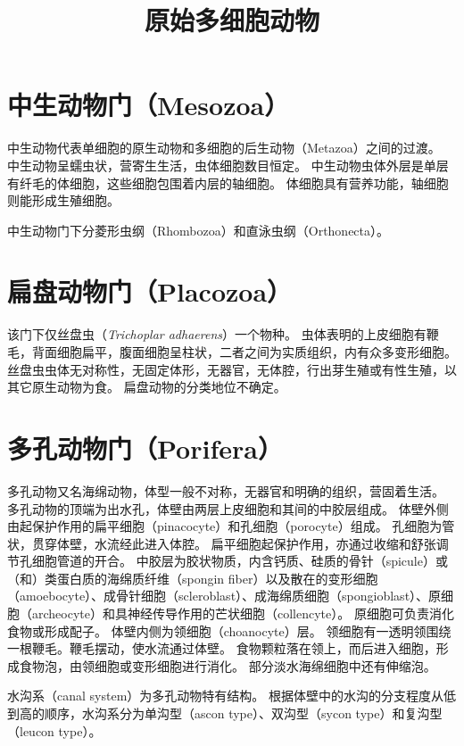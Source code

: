 \documentclass[11pt]{article}
\title{原始多细胞动物}
\date{}
\begin{document}
  \maketitle

  \linenumbers

\section{中生动物门（Mesozoa）}
中生动物代表单细胞的原生动物和多细胞的后生动物（Metazoa）之间的过渡。
中生动物呈蠕虫状，营寄生生活，虫体细胞数目恒定。
中生动物虫体外层是单层有纤毛的体细胞，这些细胞包围着内层的轴细胞。
体细胞具有营养功能，轴细胞则能形成生殖细胞。

\newline
  
中生动物门下分菱形虫纲（Rhombozoa）和直泳虫纲（Orthonecta）。
  
\section{扁盘动物门（Placozoa）}
该门下仅丝盘虫（\textit{Trichoplar adhaerens}）一个物种。
虫体表明的上皮细胞有鞭毛，背面细胞扁平，腹面细胞呈柱状，二者之间为实质组织，内有众多变形细胞。
丝盘虫虫体无对称性，无固定体形，无器官，无体腔，行出芽生殖或有性生殖，以其它原生动物为食。
扁盘动物的分类地位不确定。
  
\section{多孔动物门（Porifera）}
多孔动物又名海绵动物，体型一般不对称，无器官和明确的组织，营固着生活。
多孔动物的顶端为出水孔，体壁由两层上皮细胞和其间的中胶层组成。
体壁外侧由起保护作用的扁平细胞（pinacocyte）和孔细胞（porocyte）组成。
孔细胞为管状，贯穿体壁，水流经此进入体腔。
扁平细胞起保护作用，亦通过收缩和舒张调节孔细胞管道的开合。
中胶层为胶状物质，内含钙质、硅质的骨针（spicule）或（和）类蛋白质的海绵质纤维（spongin fiber）以及散在的变形细胞（amoebocyte）、成骨针细胞（scleroblast）、成海绵质细胞（spongioblast）、原细胞（archeocyte）和具神经传导作用的芒状细胞（collencyte）。
原细胞可负责消化食物或形成配子。
体壁内侧为领细胞（choanocyte）层。
领细胞有一透明领围绕一根鞭毛。鞭毛摆动，使水流通过体壁。
食物颗粒落在领上，而后进入细胞，形成食物泡，由领细胞或变形细胞进行消化。
部分淡水海绵细胞中还有伸缩泡。

\newline

水沟系（canal system）为多孔动物特有结构。
根据体壁中的水沟的分支程度从低到高的顺序，水沟系分为单沟型（ascon type）、双沟型（sycon type）和复沟型（leucon type）。
\end{document}
